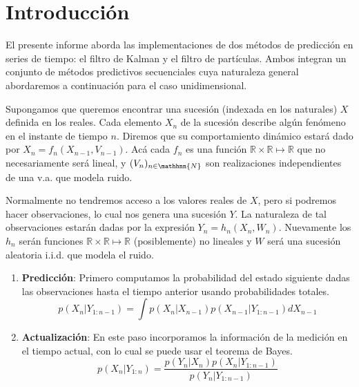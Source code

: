 \documentclass[letterpaper,11pt,oneside]{article}
\begin{document}
	





\inserttitle


\iffalse

\section{Introducción}
El presente informe aborda las implementaciones de dos métodos de predicción en series de tiempo: el filtro de Kalman y el filtro de partículas. Ambos integran un conjunto de métodos predictivos secuenciales cuya naturaleza general abordaremos a continuación para el caso unidimensional.

\newp Supongamos que queremos encontrar una sucesión (indexada en los naturales) $X$ definida en los reales. Cada elemento $X_n$ de la sucesión describe algún fenómeno en el instante de tiempo $n$. Diremos que su comportamiento dinámico estará dado por $ X_n = f_n(X_{n-1},V_{n-1})$. Acá cada $f_n$ es una función $\mathbb{R}\times\mathbb{R}\mapsto\mathbb{R}$ que no necesariamente será lineal, y $(V_n)_{n\in\mathhnn{N}}$ son realizaciones independientes de una v.a. que modela ruido. 

\newp Normalmente no tendremos acceso a los valores reales de $X$, pero si podremos hacer observaciones, lo cual nos genera una sucesión $Y$. La naturaleza de tal observaciones estarán dadas por la expresión  $ Y_n = h_n(X_n,W_n)$. Nuevamente los $h_n$ serán funciones $\mathbb{R}\times\mathbb{R}\mapsto\mathbb{R}$ (posiblemente) no lineales y $W$ será una sucesión aleatoria i.i.d. que modela el ruido. %

\begin{enumerate}
    \item \textbf{Predicción}: Primero computamos la probabilidad del estado siguiente dadas las observaciones hasta el tiempo anterior usando probabilidades totales.
    $$ p(X_n|Y_{1:n-1}) = \displaystyle \int p(X_n|X_{n-1})p(X_{n-1}|Y_{1:n-1})dX_{n-1}$$
    \item \textbf{Actualización}: En este paso incorporamos la información de la medición en el tiempo actual, con lo cual se puede usar el teorema de Bayes.
    $$ p(X_n|Y_{1:n}) = \frac{p(Y_n|X_{n})p(X_n|Y_{1:n-1})}{p(Y_n|Y_{1:n-1})}$$
\end{enumerate}
\end{document}
